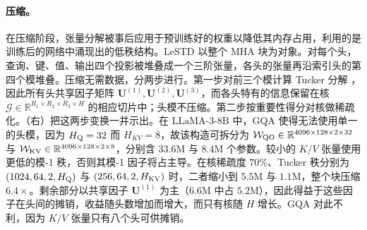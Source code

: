 \documentclass[11pt]{article}
\newcommand{\R}{\mathbb{R}}
\newcommand{\ten}[1]{\mathcal{#1}}
\newcommand{\mat}[1]{\mathbf{#1}}
\newcommand{\llama}{\text{LLaMA-3-8B}}
\begin{document}
\paragraph{压缩。}
在压缩阶段，张量分解被事后应用于预训练好的权重以降低其内存占用，利用的是训练后的网络中涌现出的低秩结构。LeSTD \cite{li2026lestd} 以整个 MHA 块为对象。对每个头，查询、键、值、输出四个投影被堆叠成一个三阶张量，各头的张量再沿索引头的第四个模堆叠。压缩无需数据，分两步进行。第一步对前三个模计算 Tucker 分解
，因此所有头共享因子矩阵 $\mat{U}^{(1)},\mat{U}^{(2)},\mat{U}^{(3)}$，而各头特有的信息保留在核 $\ten{G}\in\R^{R_1\times R_2\times R_3\times H}$ 的相应切片中；头模不压缩。第二步按重要性得分对核做稀疏化。（右）把这两步变换一并示出。在 $\llama$ 中，GQA 使得无法使用单一的头模，因为 $H_{\rm Q}=32$ 而 $H_{KV}=8$，故该构造可拆分为 $\ten{W}_{\rm QO}\in\R^{4096\times128\times2\times32}$ 与 $\ten{W}_{\rm KV}\in\R^{4096\times128\times2\times8}$，分别含 $33.6$M 与 $8.4$M 个参数。较小的 $K/V$ 张量使用更低的模-1 秩，否则其模-1 因子将占主导。在核稀疏度 $70\%$、Tucker 秩分别为 $(1024,64,2,H_{\rm Q})$ 与 $(256,64,2,H_{\rm KV})$ 时，二者缩小到 $5.5$M 与 $1.1$M，整个块压缩 $6.4\times$。剩余部分以共享因子 $\mat{U}^{(1)}$ 为主（$6.6$M 中占 $5.2$M），因此得益于这些因子在头间的摊销，收益随头数增加而增大，而只有核随 $H$ 增长。GQA 对此不利，因为 $K/V$ 张量只有八个头可供摊销。
\end{document}
